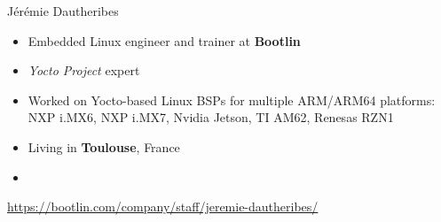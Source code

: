 \begin{frame}{Jérémie Dautheribes}
  \begin{itemize}
  \item Embedded Linux engineer and trainer at {\bf Bootlin}
  \item {\em Yocto Project} expert
  \item Worked on Yocto-based Linux BSPs for multiple ARM/ARM64
    platforms: NXP i.MX6, NXP i.MX7, Nvidia Jetson, TI AM62, Renesas
    RZN1
  \item Living in {\bf Toulouse}, France
  \item {}
  \end{itemize}
      {\small \url{https://bootlin.com/company/staff/jeremie-dautheribes/}}
\end{frame}
